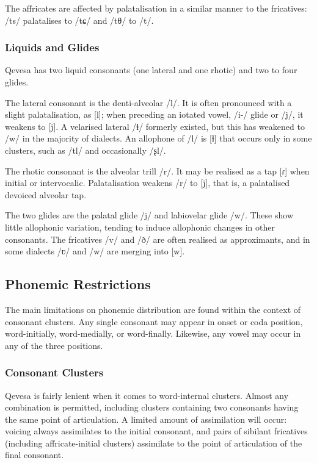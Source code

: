 \documentclass[grammar]{subfiles}
\begin{document}
  The affricates are affected by palatalisation in a similar manner to the fricatives: /ts/ palatalises to /tɕ/ and /tθ/ to /t/.

  \subsubsection{Liquids and Glides}
  \label{sssec:liquids}

  Qevesa has two liquid consonants (one lateral and one rhotic) and two to four glides.

  The lateral consonant is the denti-alveolar /l/. It is often pronounced with a slight palatalisation, as [l\superj]; when preceding an iotated vowel, /i-/ glide or /j/, it weakens to [j]. A velarised lateral /ɫ/ formerly existed, but this has weakened to /w/ in the majority of dialects. An allophone of /l/ is [ɬ] that occurs only in some clusters, such as /tl/ and occasionally /ʂl/.

  The rhotic consonant is the alveolar trill /r/. It may be realised as a tap [ɾ] when initial or intervocalic. Palatalisation weakens /r/ to [j], that is, a palatalised devoiced alveolar tap.

  The two glides are the palatal glide /j/ and labiovelar glide /w/. These show little allophonic variation, tending to induce allophonic changes in other consonants. The fricatives /v/ and /ð/ are often realised as approximants, and in some dialects /ʋ/ and /w/ are merging into [w].

  \subsection{Phonemic Restrictions}
  \label{ssec:phonemic_restrictions}

  The main limitations on phonemic distribution are found within the context of consonant clusters. Any single consonant may appear in onset or coda position, word-initially, word-medially, or word-finally. Likewise, any vowel may occur in any of the three positions. 

  \subsubsection{Consonant Clusters}
  \label{sssec:consonant_clusters}

  Qevesa is fairly lenient when it comes to word-internal clusters. Almost any combination is permitted, including clusters containing two consonants having the same point of articulation. A limited amount of assimilation will occur: voicing always assimilates to the initial consonant, and pairs of sibilant fricatives (including affricate-initial clusters) assimilate to the point of articulation of the final consonant. %
\end{document}
